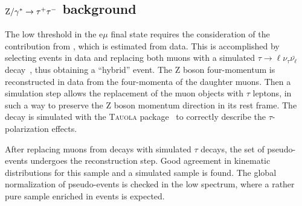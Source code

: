 \subsection[\dytt background]{\boldmath$\mathrm{Z/\gamma^* \to\tau^+\tau^-}$ background\label{sec:DYtautaubkg}}

The low \MET threshold in the e$\mu$ final state requires the consideration of the contribution from \dytt, which is estimated from data.
This is accomplished by selecting \dymm events in data and replacing both muons with a simulated
$\tau\to \ell\nu_\tau\bar{\nu_\ell}$ decay~\cite{Chatrchyan:2013iaa}, thus obtaining a ``hybrid'' event. The Z boson four-momentum is reconstructed in data from the four-momenta of the daughter muons. Then a simulation step allows the replacement of the muon objects with $\tau$ leptons, in such a way to preserve the Z boson momentum direction in its rest frame. The \dytt decay is simulated with the \textsc{Tauola} package~\cite{Jadach:1990mz} to correctly describe the $\tau$-polarization effects.

After replacing muons from \dymm decays with simulated $\tau$ decays, the set of pseudo-\dytt events undergoes the reconstruction step. Good agreement in kinematic distributions for this sample
and a simulated \dytt sample is found. The global normalization of pseudo-\dytt events is checked in the low \mt spectrum, where a rather pure sample enriched in \dytt events is expected.

